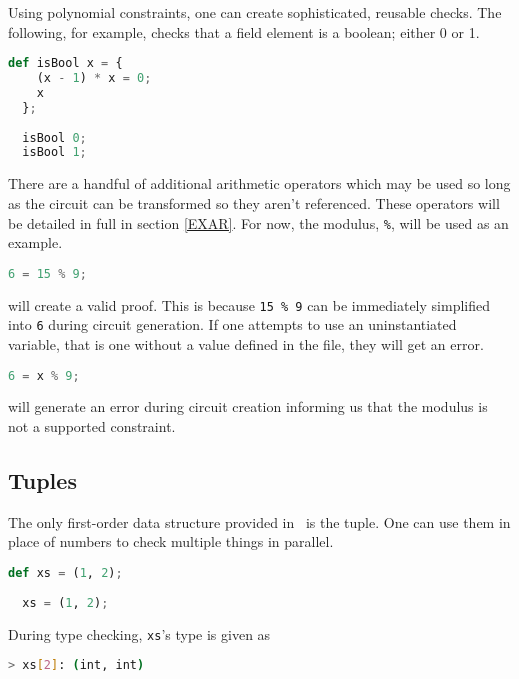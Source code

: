 Using polynomial constraints, one can create sophisticated, reusable checks. The following, for example, checks that a field element is a boolean; either 0 or 1.

\begin{lstlisting}[language=Python]
  def isBool x = { 
    (x - 1) * x = 0;
    x
  };
  
  isBool 0;
  isBool 1;
\end{lstlisting}

\label{ARITHEX}
There are a handful of additional arithmetic operators which may be used so long as the circuit can be transformed so they aren't referenced. These operators will be detailed in full in section \ref{EXAR}. For now, the modulus, \lstinline|%|, will be used as an example.

\begin{lstlisting}[language=Python]
  6 = 15 % 9;
\end{lstlisting}

will create a valid proof. This is because \lstinline|15 % 9| can be immediately simplified into \lstinline|6| during circuit generation. If one attempts to use an uninstantiated variable, that is one without a value defined in the file, they will get an error.

\begin{lstlisting}[language=Python]
  6 = x % 9;
\end{lstlisting}

will generate an error during circuit creation informing us that the modulus is not a supported constraint.






\subsection{Tuples} \label{TUP}

The only first-order data structure provided in \vampir\ is the tuple. One can use them in place of numbers to check multiple things in parallel.

\begin{lstlisting}[language=Python]
  def xs = (1, 2);
  
  xs = (1, 2);
\end{lstlisting}

During type checking, \lstinline{xs}'s type is given as

\begin{lstlisting}[language=bash]
  > xs[2]: (int, int)
\end{lstlisting}

